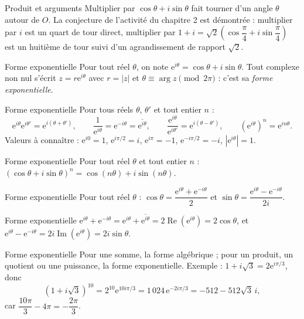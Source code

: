 \documentclass[aspectratio=169,10pt]{beamer}
\providecommand{\abs}[1]{\left\lvert #1\right\rvert}
\providecommand{\e}{\mathrm{e}}
\begin{document}
\begin{frame}{Produit et arguments}
Multiplier par \(\cos\theta+i\sin\theta\) fait tourner d'un angle \(\theta\) autour de \(O\). La conjecture de l'activité du chapitre 2 est démontrée : multiplier par \(i\) est un quart de tour direct, multiplier par \(1+i=\sqrt2\left(\cos\dfrac\pi4+i\sin\dfrac\pi4\right)\) est un huitième de tour suivi d'un agrandissement de rapport \(\sqrt2\).
\end{frame}
\begin{frame}{Forme exponentielle}
Pour tout réel \(\theta\), on note \(\e^{i\theta}=\cos\theta+i\sin\theta\). Tout complexe non nul s'écrit \(z=r\e^{i\theta}\) avec \(r=\abs z\) et \(\theta\equiv\arg z\pmod{2\pi}\) : c'est sa \emph{forme exponentielle}.
\end{frame}
\begin{frame}{Forme exponentielle}
Pour tous réels \(\theta\), \(\theta'\) et tout entier \(n\) :
\[\e^{i\theta}\e^{i\theta'}=\e^{i(\theta+\theta')},\qquad\dfrac1{\e^{i\theta}}=\e^{-i\theta}=\overline{\e^{i\theta}},\qquad\dfrac{\e^{i\theta}}{\e^{i\theta'}}=\e^{i(\theta-\theta')},\qquad\left(\e^{i\theta}\right)^n=\e^{in\theta}.\]
Valeurs à connaître : \(\e^{i0}=1\), \(\e^{i\pi/2}=i\), \(\e^{i\pi}=-1\), \(\e^{-i\pi/2}=-i\), \(\abs{\e^{i\theta}}=1\).
\end{frame}
\begin{frame}{Forme exponentielle}
Pour tout réel \(\theta\) et tout entier \(n\) : \((\cos\theta+i\sin\theta)^n=\cos(n\theta)+i\sin(n\theta)\).
\end{frame}
\begin{frame}{Forme exponentielle}
Pour tout réel \(\theta\) : \(\cos\theta=\dfrac{\e^{i\theta}+\e^{-i\theta}}2\) et \(\sin\theta=\dfrac{\e^{i\theta}-\e^{-i\theta}}{2i}\).
\end{frame}
\begin{frame}{Forme exponentielle}
\(\e^{i\theta}+\e^{-i\theta}=\e^{i\theta}+\overline{\e^{i\theta}}=2\operatorname{Re}\left(\e^{i\theta}\right)=2\cos\theta\), et \(\e^{i\theta}-\e^{-i\theta}=2i\operatorname{Im}\left(\e^{i\theta}\right)=2i\sin\theta\).
\end{frame}
\begin{frame}{Forme exponentielle}
Pour une somme, la forme algébrique ; pour un produit, un quotient ou une puissance, la forme exponentielle. Exemple : \(1+i\sqrt3=2\e^{i\pi/3}\), donc
\[\left(1+i\sqrt3\right)^{10}=2^{10}\e^{10i\pi/3}=1\,024\,\e^{-2i\pi/3}=-512-512\sqrt3\,i,\]
car \(\dfrac{10\pi}3-4\pi=-\dfrac{2\pi}3\).
\end{frame}
\end{document}
